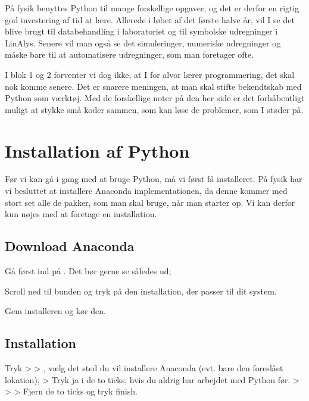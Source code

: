 \documentclass[letterpaper,10pt,english]{jupyterBook}
\begin{document}
På fysik benyttes Python til mange forskellige opgaver, og det er derfor en rigtig god investering af tid at lære. Allerede i løbet af det første halve år, vil I se det blive brugt til databehandling i laboratoriet og til symbolske udregninger i LinAlys. Senere vil man også se det simuleringer, numeriske udregninger og måske bare til at automatisere udregninger, som man foretager ofte.

I blok 1 og 2 forventer vi dog ikke, at I for alvor lærer programmering, det skal nok komme senere. Det er snarere meningen, at man skal stifte bekendtskab med Python som værktøj. Med de forskellige noter på den her side er det forhåbentligt muligt at stykke små koder sammen, som kan løse de problemer, som I støder på.


\chapter{Installation af Python}
\label{\detokenize{notebooks/Download_guide_anaconda/Download_anaconda_jupyter:installation-af-python}}\label{\detokenize{notebooks/Download_guide_anaconda/Download_anaconda_jupyter::doc}}
Før vi kan gå i gang med at bruge Python, må vi først få installeret. På fysik har vi besluttet at installere Anaconda implementationen, da denne kommer med stort set alle de pakker, som man skal bruge, når man starter op. Vi kan derfor kun nøjes med at foretage en installation.


\section{Download Anaconda}
\label{\detokenize{notebooks/Download_guide_anaconda/Download_anaconda_jupyter:download-anaconda}}
Gå først ind på . Det bør gerne se således ud;

Scroll ned til bunden og tryk på den installation, der passer til dit system.

Gem installeren og kør den.


\section{Installation}
\label{\detokenize{notebooks/Download_guide_anaconda/Download_anaconda_jupyter:installation}}
Tryk  >  > , vælg det sted du vil installere Anaconda (evt. bare den foreslået lokation), > Tryk ja i de to ticks, hvis du aldrig har arbejdet med Python før.  >  >  > Fjern de to ticks og tryk finish.
\end{document}
